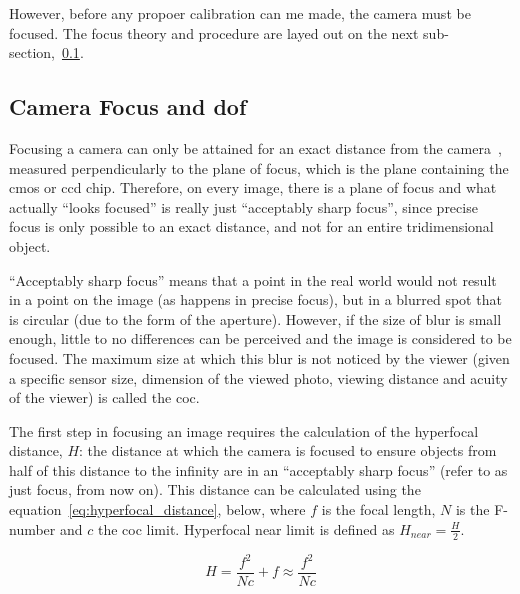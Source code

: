 However, before any propoer calibration can me made, the camera must be focused. The focus theory and procedure are layed out on the next sub-section,~\ref{subsec:calibration:camera-focus}.



\subsection{Camera Focus and \acl{dof}}
\label{subsec:calibration:camera-focus}
Focusing a camera can only be attained for an exact distance from the camera~\cite{Merklinger1993, Photopillers}, measured perpendicularly to the plane of focus, which is the plane containing the \ac{cmos} or \ac{ccd} chip. Therefore, on every image, there is a plane of focus and what actually ``looks focused'' is really just ``acceptably sharp focus'', since precise focus is only possible to an exact distance, and not for an entire tridimensional object.

``Acceptably sharp focus'' means that a point in the real world would not result in a point on the image (as happens in precise focus), but in a blurred spot that is circular (due to the form of the aperture)\cite{Photopillers}. However, if the size of blur is small enough, little to no differences can be perceived and the image is considered to be focused\cite{Photopillers}. The maximum size at which this blur is not noticed by the viewer (given a specific sensor size, dimension of the viewed photo, viewing distance and acuity of the viewer) is called the \ac{coc}\cite{Photopillers, Merklinger1993}.

The first step in focusing an image requires the calculation of the hyperfocal distance, $H$: the distance at which the camera is focused to ensure objects from half of this distance to the infinity are in an ``acceptably sharp focus'' (refer to as just focus, from now on). This distance can be calculated using the equation~\ref{eq:hyperfocal_distance}, below, where $f$ is the focal length, $N$ is the F-number and $c$ the \ac{coc} limit. Hyperfocal near limit is defined as $H_{near} = \frac{H}{2}$.

\begin{equation}
	\label{eq:hyperfocal_distance}
	H = \frac{f^2}{Nc} + f \approx \frac{f^2}{Nc} 
\end{equation}


